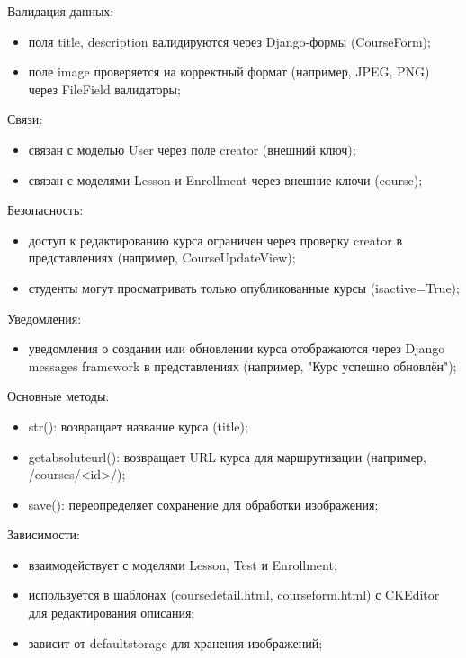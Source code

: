 Валидация данных: 
\begin{itemize}
	\item поля title, description валидируются через Django-формы (CourseForm); 
	\item поле image проверяется на корректный формат (например, JPEG, PNG) через FileField валидаторы; 
\end{itemize}

Связи: 
\begin{itemize}
	\item связан с моделью User через поле creator (внешний ключ); 
	\item связан с моделями Lesson и Enrollment через внешние ключи (course); 
\end{itemize}

Безопасность: 
\begin{itemize}
	\item доступ к редактированию курса ограничен через проверку creator в представлениях (например, CourseUpdateView); 
	\item студенты могут просматривать только опубликованные курсы (isactive=True); 
\end{itemize}

Уведомления: 
\begin{itemize}
	\item уведомления о создании или обновлении курса отображаются через Django messages framework в представлениях (например, "Курс успешно обновлён"); 
\end{itemize}

Основные методы: 
\begin{itemize}
	\item str(): возвращает название курса (title); 
	\item getabsoluteurl(): возвращает URL курса для маршрутизации (например, /courses/<id>/); 
	\item save(): переопределяет сохранение для обработки изображения; 
\end{itemize}

Зависимости: 
\begin{itemize}
	\item взаимодействует с моделями Lesson, Test и Enrollment; 
	\item используется в шаблонах (coursedetail.html, courseform.html) с CKEditor для редактирования описания; 
	\item зависит от defaultstorage для хранения изображений; 
\end{itemize}

